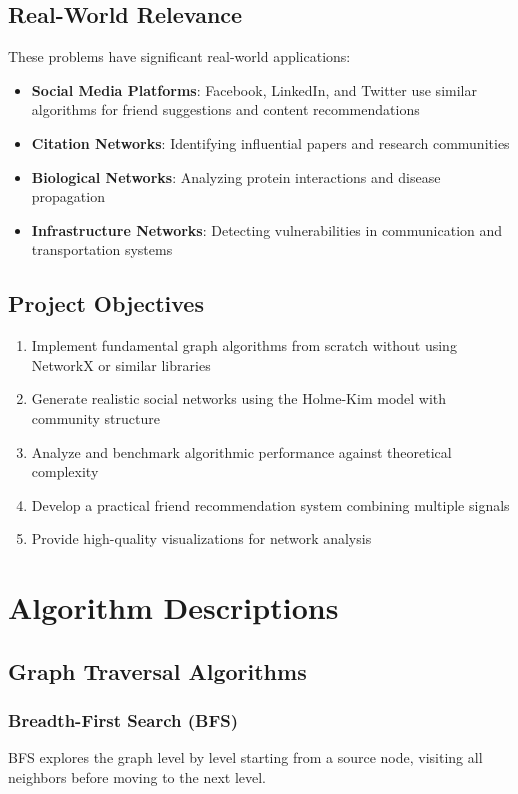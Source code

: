 \documentclass[12pt,a4paper]{article}
\begin{document}
\subsection{Real-World Relevance}
These problems have significant real-world applications:
\begin{itemize}
    \item \textbf{Social Media Platforms}: Facebook, LinkedIn, and Twitter use similar algorithms for friend suggestions and content recommendations
    \item \textbf{Citation Networks}: Identifying influential papers and research communities
    \item \textbf{Biological Networks}: Analyzing protein interactions and disease propagation
    \item \textbf{Infrastructure Networks}: Detecting vulnerabilities in communication and transportation systems
\end{itemize}

\subsection{Project Objectives}
\begin{enumerate}
    \item Implement fundamental graph algorithms from scratch without using NetworkX or similar libraries
    \item Generate realistic social networks using the Holme-Kim model with community structure
    \item Analyze and benchmark algorithmic performance against theoretical complexity
    \item Develop a practical friend recommendation system combining multiple signals
    \item Provide high-quality visualizations for network analysis
\end{enumerate}

\section{Algorithm Descriptions}

\subsection{Graph Traversal Algorithms}

\subsubsection{Breadth-First Search (BFS)}
BFS explores the graph level by level starting from a source node, visiting all neighbors before moving to the next level.
\end{document}

